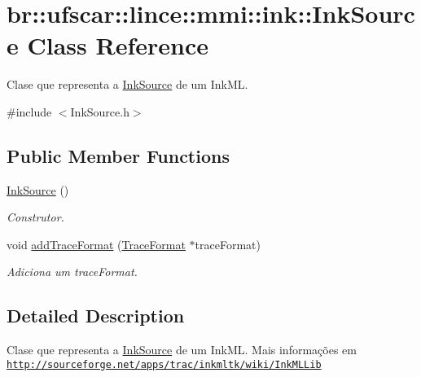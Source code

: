 \hypertarget{classbr_1_1ufscar_1_1lince_1_1mmi_1_1ink_1_1InkSource}{
\section{br::ufscar::lince::mmi::ink::InkSource Class Reference}
\label{classbr_1_1ufscar_1_1lince_1_1mmi_1_1ink_1_1InkSource}
}


Clase que representa a \hyperlink{classbr_1_1ufscar_1_1lince_1_1mmi_1_1ink_1_1InkSource}{InkSource} de um InkML.  




{\ttfamily \#include $<$InkSource.h$>$}

\subsection*{Public Member Functions}
\begin{DoxyCompactItemize}
\item 
\hyperlink{classbr_1_1ufscar_1_1lince_1_1mmi_1_1ink_1_1InkSource_a5888d2b6cd9e1dde2aafa26c006e7f2a}{InkSource} ()
\begin{DoxyCompactList}\small\item\em Construtor. \item\end{DoxyCompactList}\item 
void \hyperlink{classbr_1_1ufscar_1_1lince_1_1mmi_1_1ink_1_1InkSource_a304b6c7e9ef21b86db8a5eb54d3728cc}{addTraceFormat} (\hyperlink{classbr_1_1ufscar_1_1lince_1_1mmi_1_1ink_1_1TraceFormat}{TraceFormat} $\ast$traceFormat)
\begin{DoxyCompactList}\small\item\em Adiciona um traceFormat. \item\end{DoxyCompactList}\end{DoxyCompactItemize}


\subsection{Detailed Description}
Clase que representa a \hyperlink{classbr_1_1ufscar_1_1lince_1_1mmi_1_1ink_1_1InkSource}{InkSource} de um InkML. Mais informações em \href{http://sourceforge.net/apps/trac/inkmltk/wiki/InkMLLib}{\tt http://sourceforge.net/apps/trac/inkmltk/wiki/InkMLLib} 

